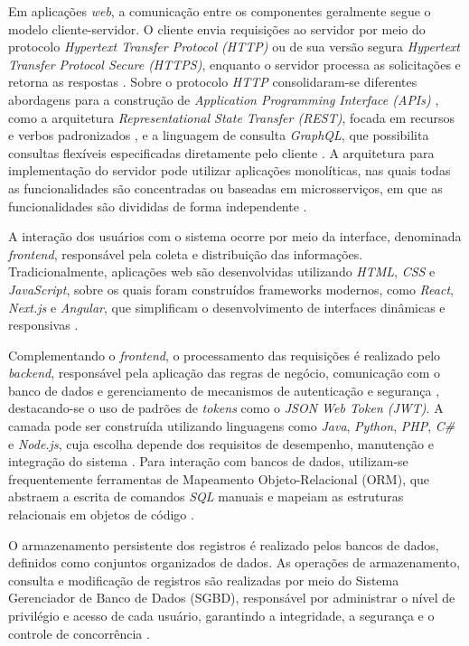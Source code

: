 \documentclass[12pt]{unisenaiclass}
\begin{document}
Em aplicações \textit{web}, a comunicação entre os componentes geralmente segue o modelo cliente-servidor. O cliente envia requisições ao servidor por meio do protocolo \textit{Hypertext Transfer Protocol (HTTP)} ou de sua versão segura \textit{Hypertext Transfer Protocol Secure (HTTPS)}, enquanto o servidor processa as solicitações e retorna as respostas \cite{oluwatosserver2014}. Sobre o protocolo \textit{HTTP} consolidaram-se diferentes abordagens para a construção de \textit{Application Programming Interface (APIs)} \cite{richardsonrestful2013}, como a arquitetura \textit{Representational State Transfer (REST)}, focada em recursos e verbos padronizados \cite{fieldingnetwork2000}, e a linguagem de consulta \textit{GraphQL}, que possibilita consultas flexíveis especificadas diretamente pelo cliente \cite{hartiggraphql2018}. A arquitetura para implementação do servidor pode utilizar aplicações monolíticas, nas quais todas as funcionalidades são concentradas ou baseadas em microsserviços, em que as funcionalidades são divididas de forma independente \cite{richardsarchitecture2015}.

A interação dos usuários com o sistema ocorre por meio da interface, denominada \textit{frontend}, responsável pela coleta e distribuição das informações. Tradicionalmente, aplicações web são desenvolvidas utilizando \textit{HTML}, \textit{CSS} e \textit{JavaScript}, sobre os quais foram construídos frameworks modernos, como \textit{React}, \textit{Next.js} e \textit{Angular}, que simplificam o desenvolvimento de interfaces dinâmicas e responsivas \cite{javierweb2023}.

Complementando o \textit{frontend}, o processamento das requisições é realizado pelo \textit{backend}, responsável pela aplicação das regras de negócio, comunicação com o banco de dados e gerenciamento de mecanismos de autenticação e segurança \cite{owasp,jonesjwt2015}, destacando-se o uso de padrões de \textit{tokens} como o \textit{JSON Web Token (JWT)}. A camada pode ser construída utilizando linguagens como \textit{Java}, \textit{Python}, \textit{PHP}, \textit{C\#} e \textit{Node.js}, cuja escolha depende dos requisitos de desempenho, manutenção e integração do sistema \cite{javierweb2023}. Para interação com bancos de dados, utilizam-se frequentemente ferramentas de Mapeamento Objeto-Relacional (ORM), que abstraem a escrita de comandos \textit{SQL} manuais e mapeiam as estruturas relacionais em objetos de código \cite{fowlerapp2002}.

O armazenamento persistente dos registros é realizado pelos bancos de dados, definidos como conjuntos organizados de dados. As operações de armazenamento, consulta e modificação de registros são realizadas por meio do Sistema Gerenciador de Banco de Dados (SGBD), responsável por administrar o nível de privilégio e acesso de cada usuário, garantindo a integridade, a segurança e o controle de concorrência \cite{silberschatzbanco2006}.
\end{document}
